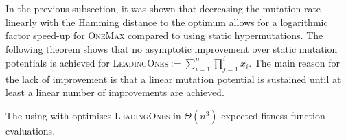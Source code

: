 \documentclass[lettersize,journal]{IEEEtran}
\begin{document}
In the previous subsection, it was shown that decreasing the mutation rate linearly with the Hamming distance to the optimum allows for a logarithmic factor speed-up for \textsc{OneMax} compared to using  static hypermutations. The following theorem shows that no asymptotic improvement over static mutation potentials is achieved for \textsc{LeadingOnes}$:= \sum_{i=1}^{n}\prod_{j=1}^{i}x_i$. The main reason for the lack of improvement is that a linear mutation potential is sustained until at least a linear number of improvements are achieved.


\begin{theorem} \label{th:linHD-LO}
The {\oneoneIA } using \IPHfcm{} with {\linHD } optimises \textsc{LeadingOnes} in $\Theta(n^3)$ expected fitness function evaluations.
\end{theorem}
\end{document}
